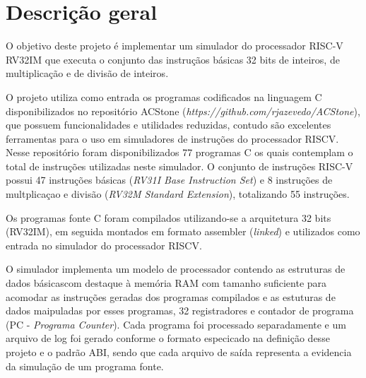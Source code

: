 
\section{Descrição geral}


O objetivo deste projeto é implementar um simulador do processador RISC-V RV32IM que executa o conjunto das instruçãos básicas 32 bits de inteiros, de multiplicação e de divisão de inteiros.

O projeto utiliza como entrada os programas codificados na linguagem C disponibilizados no repositório ACStone (\textit{https://github.com/rjazevedo/ACStone}), que possuem funcionalidades e utilidades reduzidas, contudo são excelentes ferramentas para o uso em simuladores de instruções do processador RISCV. Nesse repositório foram disponibilizados 77 programas C os quais contemplam o total de instruções utilizadas neste simulador. O conjunto de instruções RISC-V possui 47 instruções básicas (\textit{RV31I Base Instruction Set}) e 8 instruções de multplicaçao e divisão (\textit{RV32M Standard Extension}), totalizando 55 instruções. 

Os programas fonte C foram compilados utilizando-se a arquitetura 32 bits (RV32IM), em seguida montados em formato assembler (\textit{linked}) e utilizados como entrada no simulador do processador RISCV.

O simulador implementa um modelo de processador contendo as estruturas de dados básicascom destaque à memória RAM com tamanho suficiente para acomodar as instruções geradas dos programas compilados e as estuturas de dados maipuladas por esses programas, 32 registradores e contador de programa (PC - \textit{Programa Counter}). Cada programa foi processado separadamente e um arquivo de log foi gerado conforme o formato especicado na definição desse projeto e o padrão ABI, sendo que cada arquivo de saída representa a evidencia da simulação de um programa fonte.
